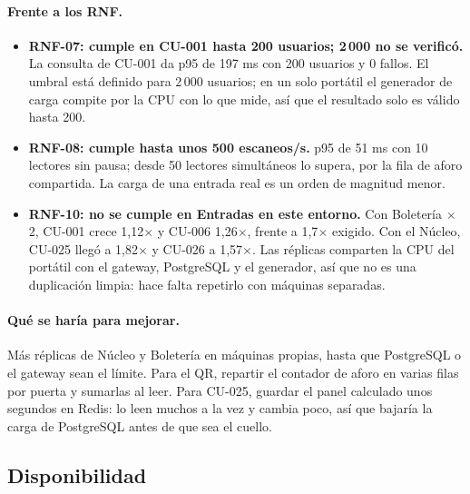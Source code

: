 \paragraph{Frente a los RNF.}
\begin{itemize}
\item \textbf{RNF-07: cumple en CU-001 hasta 200 usuarios; 2\,000 no se verificó.} La consulta de
CU-001 da p95 de 197 ms con 200 usuarios y 0 fallos. El umbral está definido para 2\,000
usuarios; en un solo portátil el generador de carga compite por la CPU con lo que mide, así que
el resultado solo es válido hasta 200.
\item \textbf{RNF-08: cumple hasta unos 500 escaneos/s.} p95 de 51 ms con 10 lectores sin pausa; desde 50
lectores simultáneos lo supera, por la fila de aforo compartida. La carga de una entrada real
es un orden de magnitud menor.
\item \textbf{RNF-10: no se cumple en Entradas en este entorno.} Con Boletería $\times$2, CU-001 crece
1,12$\times$ y CU-006 1,26$\times$, frente a 1,7$\times$ exigido. Con el Núcleo, CU-025 llegó a
1,82$\times$ y CU-026 a 1,57$\times$. Las réplicas comparten la CPU del portátil con el gateway,
PostgreSQL y el generador, así que no es una duplicación limpia: hace falta repetirlo con
máquinas separadas.
\end{itemize}

\paragraph{Qué se haría para mejorar.} Más réplicas de Núcleo y Boletería en máquinas propias, hasta
que PostgreSQL o el gateway sean el límite. Para el QR, repartir el contador de aforo en varias
filas por puerta y sumarlas al leer. Para CU-025, guardar el panel calculado unos segundos en Redis: lo leen
muchos a la vez y cambia poco, así que bajaría la carga de PostgreSQL antes de que sea el cuello.

\subsection{Disponibilidad}
\label{sec:disponibilidad-vigente}

